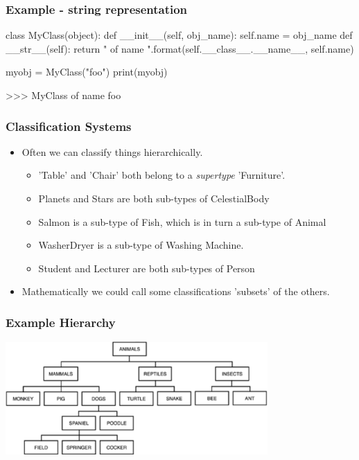 \documentclass{beamer}
\begin{document}
\begin{frame}[fragile]
\frametitle{Example - string representation}
\begin{code}
class MyClass(object):
  def __init__(self, obj_name):
    self.name = obj_name
  def __str__(self):
    return "{} of name {}".format(self.__class__.__name__, 
                              self.name)
                              
myobj = MyClass("foo")
print(myobj)

>>> MyClass of name foo

\end{code}
\end{frame}


\begin{frame}[fragile]
\frametitle{Classification Systems}
\begin{itemize}
\item Often we can classify things hierarchically.
\begin{itemize}
\item 'Table' and 'Chair' both belong to a \emph{supertype} 'Furniture'.
\pause
\item Planets and Stars are both sub-types of CelestialBody
\item Salmon is a sub-type of Fish, which is in turn a sub-type of Animal
\item WasherDryer is a sub-type of Washing Machine.
\item Student and Lecturer are both sub-types of Person
\end{itemize}
\pause
\item Mathematically we could call some classifications 'subsets' of the others.
\end{itemize}

\end{frame}

\begin{frame}[fragile]
\frametitle{Example Hierarchy}
\includegraphics[width=10cm]{animal_hierarch.pdf}
\end{frame}
\end{document}
